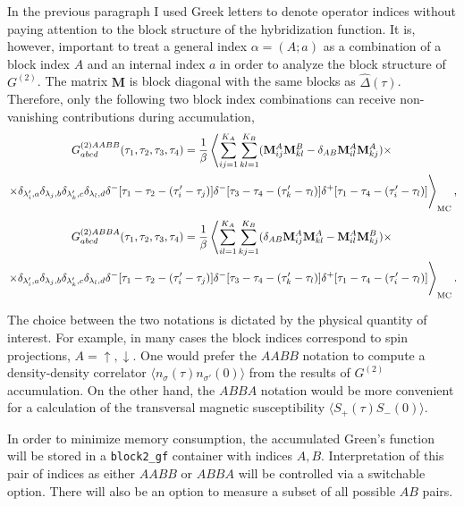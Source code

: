 \documentclass[a4paper,12pt]{article}
\renewcommand{\t}{\ensuremath{\tau}}
\begin{document}
In the previous paragraph I used Greek letters to denote operator indices without paying attention to the block structure of the hybridization function.
It is, however, important to treat a general index $\alpha=(A;a)$ as a combination of a
block index $A$ and an internal index $a$ in order to analyze the block structure of
$G^{(2)}$. The matrix $\mathbf{M}$ is block diagonal with the same blocks as $\hat \Delta(\t)$. Therefore, only the following two block index combinations can receive
non-vanishing contributions during accumulation,
\begin{multline}\label{accum_AABB}
	G^{(2)AABB}_{abcd}(\t_1,\t_2,\t_3,\t_4) =
	\frac{1}{\beta}\left\langle
	\sum_{ij=1}^{K_A}\sum_{kl=1}^{K_B}
	(\mathbf{M}^A_{ij} \mathbf{M}^B_{kl} - \delta_{AB}\mathbf{M}^A_{il} \mathbf{M}^A_{kj})
	\times\right.\\\left.\times
	\delta_{\lambda'_i,a} \delta_{\lambda_j,b}\delta_{\lambda'_k,c} \delta_{\lambda_l,d}
	\delta^-[\t_1 - \t_2 -(\t'_i-\t_j)]\delta^-[\t_3-\t_4-(\t'_k-\t_l)]
	\delta^+[\t_1-\t_4-(\tau'_i-\tau_l)]
	\vphantom{\sum_{ijkl=1}^K} \right\rangle_\mathrm{MC},
\end{multline}
\begin{multline}\label{accum_ABBA}
	G^{(2)ABBA}_{abcd}(\t_1,\t_2,\t_3,\t_4) =
	\frac{1}{\beta}\left\langle
	\sum_{il=1}^{K_A}\sum_{kj=1}^{K_B}
	(\delta_{AB}\mathbf{M}^A_{ij} \mathbf{M}^A_{kl} - \mathbf{M}^A_{il} \mathbf{M}^B_{kj})
	\times\right.\\\left.\times
	\delta_{\lambda'_i,a} \delta_{\lambda_j,b}\delta_{\lambda'_k,c} \delta_{\lambda_l,d}
	\delta^-[\t_1 - \t_2 -(\t'_i-\t_j)]\delta^-[\t_3-\t_4-(\t'_k-\t_l)]
	\delta^+[\t_1-\t_4-(\tau'_i-\tau_l)]
	\vphantom{\sum_{ijkl=1}^K} \right\rangle_\mathrm{MC}.
\end{multline}

The choice between the two notations is dictated by the physical quantity of interest.
For example, in many cases the block indices correspond to spin projections,
$A=\uparrow,\downarrow$. One would prefer the $AABB$ notation to compute a
density-density correlator $\langle n_\sigma(\t)n_{\sigma'}(0)\rangle$ from the results
of $G^{(2)}$ accumulation. On the other hand, the $ABBA$ notation would be more
convenient for a calculation of the transversal magnetic susceptibility $\langle S_+(\t)S_-(0) \rangle$.

In order to minimize memory consumption, the accumulated Green's function will be stored
in a \texttt{block2\_gf} container with indices $A,B$. Interpretation of this
pair of indices
as either $AABB$ or $ABBA$ will be controlled via a switchable option. There will also be
an option to measure a subset of all possible $AB$ pairs.
\end{document}
